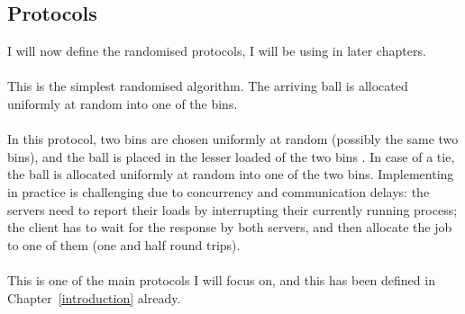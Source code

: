 \subsection{Protocols} \label{protocols}

I will now define the randomised protocols, I will be using in later chapters.

\paragraph{\OneChoice}

This is the simplest randomised algorithm. The arriving ball is allocated uniformly at random into one of the bins.

\paragraph{\TwoChoice}
In this protocol, two bins are chosen uniformly at random (possibly the same two bins), and the ball is placed in the lesser loaded of the two bins . In case of a tie, the ball is allocated uniformly at random into one of the two bins. Implementing \TwoChoice in practice is challenging due to concurrency and communication delays: the servers need to report their loads by interrupting their currently running process; the client has to wait for the response by both servers, and then allocate the job to one of them (one and half round trips).

\paragraph{\TwoThinning}

This is one of the main protocols I will focus on, and this has been defined in Chapter~\ref{introduction} already.


